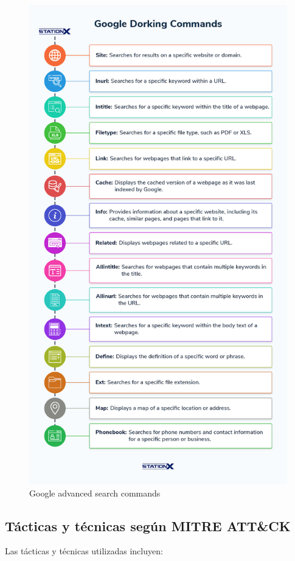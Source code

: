 \begin{paracol}{2}
        \begin{figure}[htbp]
            \centering
            \includegraphics{images/googledorking.png}
            \caption{Google advanced search commands}
            \label{fig:googledorking}
        \end{figure}
    \end{paracol}
    
    \subsection{Tácticas y técnicas según MITRE ATT\&CK}
    Las tácticas y técnicas utilizadas incluyen:

